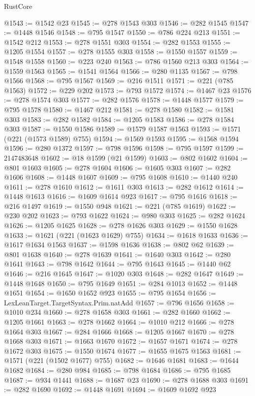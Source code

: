 \begin{lexlean}{RustCore}
\begin{coremodule}
@1543 := @1542 @23
@1545 := @278 @1543 @303
@1546 := @282 @1545
@1547 := @1448 @1546
@1548 := @795 @1547
@1550 := @786 @224 @213
@1551 := @1542 @212
@1553 := @278 @1551 @303
@1554 := @282 @1553
@1555 := @1205 @1554
@1557 := @278 @1555 @303
@1558 := @1550 @1557
@1559 := @1548 @1558
@1560 := @223 @240
@1563 := @786 @1560 @213 @303
@1564 := @1559 @1563
@1565 := @1541 @1564
@1566 := @280 @1135
@1567 := @798 @1566
@1568 := @795 @1567
@1569 := @216 @1511
@1571 := @221 (@785 @1563)
@1572 := @229 @202
@1573 := @793 @1572
@1574 := @1467 @23
@1576 := @278 @1574 @303
@1577 := @282 @1576
@1578 := @1448 @1577
@1579 := @795 @1578
@1580 := @1467 @212
@1581 := @278 @1580
@1582 := @1581 @303
@1583 := @282 @1582
@1584 := @1205 @1583
@1586 := @278 @1584 @303
@1587 := @1550 @1586
@1589 := @1579 @1587 @1563
@1593 := @1571 (@221 (@1573 @1589) @755)
@1594 := @1569 @1593
@1595 := @1568 @1594
@1596 := @280 @1372
@1597 := @798 @1596
@1598 := @795 @1597
@1599 := 2147483648
@1602 := @18 @1599 (@21 @1599)
@1603 := @802 @1602
@1604 := @801 @1603
@1605 := @278 @1604
@1606 := @1605 @303
@1607 := @282 @1606
@1608 := @1448 @1607
@1609 := @795 @1608
@1610 := @1440 @240
@1611 := @278 @1610
@1612 := @1611 @303
@1613 := @282 @1612
@1614 := @1448 @1613
@1616 := @1609 @1614 @923
@1617 := @795 @1616
@1618 := @216 @1497
@1619 := @1550 @948
@1621 := @221 (@785 @1619)
@1622 := @230 @202
@1623 := @793 @1622
@1624 := @980 @303
@1625 := @282 @1624
@1626 := @1205 @1625
@1628 := @278 @1626 @303
@1629 := @1550 @1628
@1633 := @1621 (@221 (@1623 @1629) @755)
@1634 := @1618 @1633
@1636 := @1617 @1634 @1563
@1637 := @1598 @1636
@1638 := @802 @62
@1639 := @801 @1638
@1640 := @278 @1639
@1641 := @1640 @303
@1642 := @280 @1641
@1643 := @798 @1642
@1644 := @795 @1643
@1645 := @1440 @62
@1646 := @216 @1645
@1647 := @1020 @303
@1648 := @282 @1647
@1649 := @1448 @1648
@1650 := @795 @1649
@1651 := @284 @1013
@1652 := @1448 @1651
@1654 := @1650 @1652 @923
@1655 := @795 @1654
@1656 := LexLeanTarget.TargetSyntax.Prim.natAdd
@1657 := @796 @1656
@1658 := @1010 @234
@1660 := @278 @1658 @303
@1661 := @282 @1660
@1662 := @1205 @1661
@1663 := @278 @1662
@1664 := @1010 @212
@1666 := @278 @1664 @303
@1667 := @284 @1666
@1668 := @1205 @1667
@1670 := @278 @1668 @303
@1671 := @1663 @1670
@1672 := @1657 @1671
@1674 := @278 @1672 @303
@1675 := @1550 @1674
@1677 := @1655 @1675 @1563
@1681 := @1571 (@221 (@1502 @1677) @755)
@1682 := @1646 @1681
@1683 := @1644 @1682
@1684 := @280 @984
@1685 := @798 @1684
@1686 := @795 @1685
@1687 := @934 @1441
@1688 := @1687 @23
@1690 := @278 @1688 @303
@1691 := @282 @1690
@1692 := @1448 @1691
@1694 := @1609 @1692 @923

\end{coremodule}
\end{lexlean}
